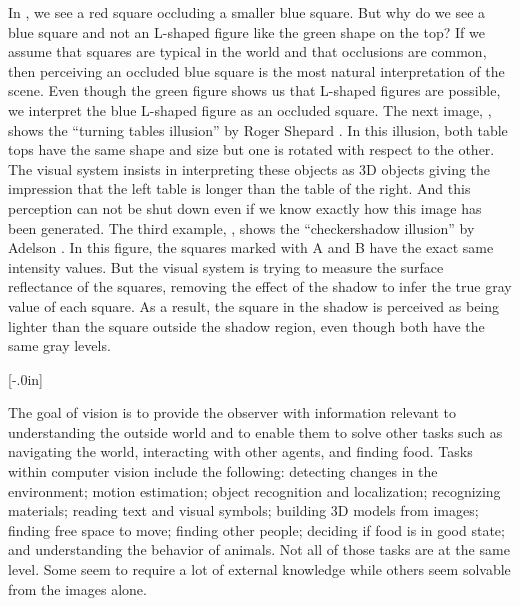 In , we see a red square occluding a smaller blue square. But why do we see a blue square and not an L-shaped figure like the green shape on the top? If we assume that squares are typical in the world and that occlusions are common, then perceiving an occluded blue square is the most natural interpretation of the scene. Even though the green figure shows us that L-shaped figures are possible, we interpret the blue L-shaped figure as an occluded square. The next image, , shows the ``turning tables illusion'' by Roger Shepard \cite{Shepard90}. In this illusion, both table tops have the same shape and size but one is rotated with respect to the other. The visual system insists in interpreting these objects as 3D objects giving the impression that the left table is longer than the table of the right.
And this perception can not be shut down even if we know exactly how this image has been generated. The third example, , shows the ``checkershadow illusion'' by Adelson \cite{adelson1995checkershadow}. In this figure, the squares marked with A and B have the exact same intensity values. But the visual system is trying to measure the surface reflectance of the squares, removing the effect of the shadow to infer the true gray value of each square. As a result, the square in the shadow is perceived as being lighter than the square outside the shadow region, even though both have the same gray levels.

[-.0in]


The goal of vision is to provide the observer with information relevant to understanding the outside world and to enable them to solve other tasks such as navigating the world, interacting with other agents, and finding food. Tasks within computer vision include the following: detecting changes in the environment; motion estimation; object recognition and localization; recognizing materials; reading text and visual symbols; building 3D models from images; finding free space to move; finding other people; deciding if food is in good state; and understanding the behavior of animals. Not all of those tasks are at the same level. Some seem to require a lot of external knowledge while others seem solvable from the images alone.

